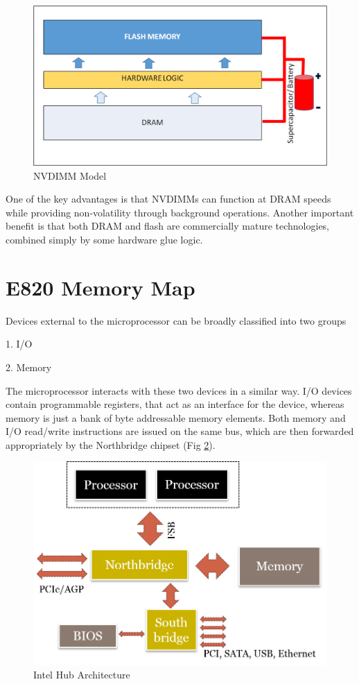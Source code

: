 \begin{figure}[H]
  \centering
  \includegraphics[scale=0.6]{figures/NVDIMM_Stack.png}
  \caption{NVDIMM Model}
  \label{fig:nvdimm}
\end{figure}
One of the key advantages is that NVDIMMs can function at DRAM speeds while providing non-volatility through background operations. Another important benefit is that both DRAM and flash are commercially mature technologies, combined simply by some hardware glue logic. 

\section{E820 Memory Map}



Devices external to the microprocessor can be broadly classified into two groups

1. I/O

2. Memory

The microprocessor interacts with these two devices in a similar way. I/O devices contain programmable registers, that act as an interface for the device, whereas memory is just a bank of byte addressable memory elements. Both memory and I/O read/write instructions are issued on the same bus, which are then forwarded appropriately by the Northbridge chipset (Fig \ref{fig:intel_arch}). 

\setlength{\belowcaptionskip}{-10pt}

\begin{figure}[H]
  \centering
  \includegraphics[scale=0.6]{figures/intelhubarchi.png}
  \caption{Intel Hub Architecture}
  \label{fig:intel_arch}
\end{figure}

